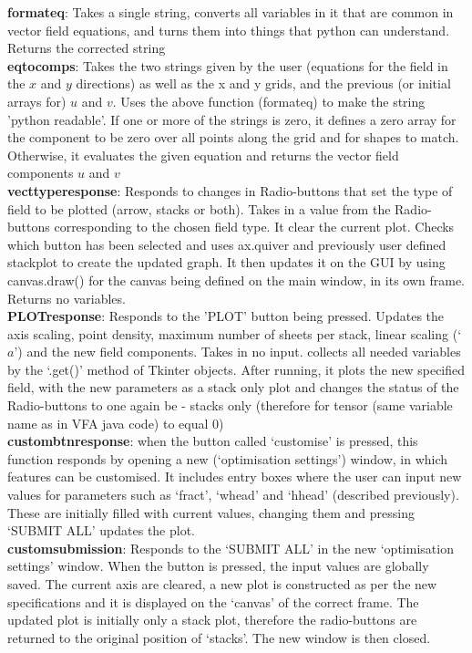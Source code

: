 \documentclass[11]{report}
\begin{document}
\textbf{format\textunderscore eq}: Takes a single string, converts all variables in it that are common in vector field equations, and turns them into things that python can understand. Returns the corrected string\\
\textbf{eq\textunderscore to\textunderscore comps}: Takes the two strings given by the user (equations for the field in the $x$ and $y$ directions) as well as the x and y grids, and the previous (or initial arrays for) $u$ and $v$. Uses the above function (format\textunderscore eq) to make the string 'python readable'. If one or more of the strings is zero, it defines a zero array for the component to be zero over all points along the grid and for shapes to match. Otherwise, it evaluates the given equation and returns the vector field components $u$ and $v$\\
\textbf{vect\textunderscore type\textunderscore response}: Responds to changes in Radio-buttons that set the type of field to be plotted (arrow, stacks or both). Takes in a value from the Radio-buttons corresponding to the chosen field type. It clear the current plot. Checks which button has been selected and uses ax.quiver and previously user defined stack\textunderscore plot to create the updated graph. It then updates it on the GUI by using canvas.draw() for the canvas being defined on the main window, in its own frame. Returns no variables.\\
\textbf{PLOT\textunderscore response}: Responds to the 'PLOT' button being pressed. Updates the axis scaling, point density, maximum number of sheets per stack, linear scaling (`$a$') and the new field components. Takes in no input. collects all needed variables by the `.get()' method of Tkinter objects. After running, it plots the new specified field, with the new parameters as a stack only plot and changes the status of the Radio-buttons to one again be - stacks only (therefore for tensor (same variable name as in VFA java code) to equal 0)\\
\textbf{custom\textunderscore btn\textunderscore response}: when the button called `customise' is pressed, this function responds by opening a new (`optimisation settings') window, in which features can be customised. It includes entry boxes where the user can input new values for parameters such as `fract', `w\textunderscore head' and `h\textunderscore head' (described previously). These are initially filled with current values, changing them and pressing `SUBMIT ALL' updates the plot.\\
\textbf{custom\textunderscore submission}: Responds to the `SUBMIT ALL' in the new `optimisation settings' window. When the button is pressed, the input values are globally saved. The current axis are cleared, a new plot is constructed as per the new specifications and it is displayed on the `canvas' of the correct frame. The updated plot is initially only a stack plot, therefore the radio-buttons are returned to the original position of `stacks'. The new window is then closed.
\end{document}
